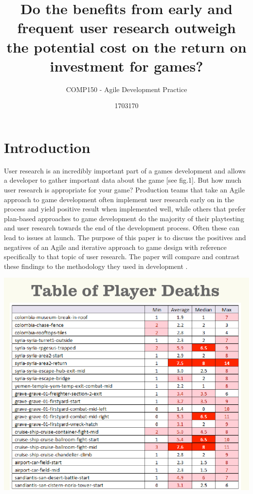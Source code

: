 \documentclass{scrartcl}
\title{Do the benefits from early and frequent user research outweigh the potential cost on the return on investment for games?
}
\subtitle{COMP150 - Agile Development Practice}
\author{1703170}
\begin{document}
\maketitle


\section{Introduction}

User research is an incredibly important part of a games development and allows a developer to gather important data about the game [see fig.1]. But how much user research is appropriate for your game? Production teams that take an Agile approach \cite{fowler2001agile:1} to game development often implement user research early on in the process and yield positive result when implemented well, while others that prefer plan-based approaches to game development do the majority of their playtesting and user research towards the end of the development process. Often these can lead to issues at launch. The purpose of this paper is to discuss the positives and negatives of an Agile and iterative approach to game design with reference specifically to that topic of user research. The paper will compare and contrast these findings to the methodology they used in development \cite{politowski2016old:2}.

\begin{center}
\includegraphics[scale=0.4]{PlayerDeathTable.png}
\end{center}
\end{document}
